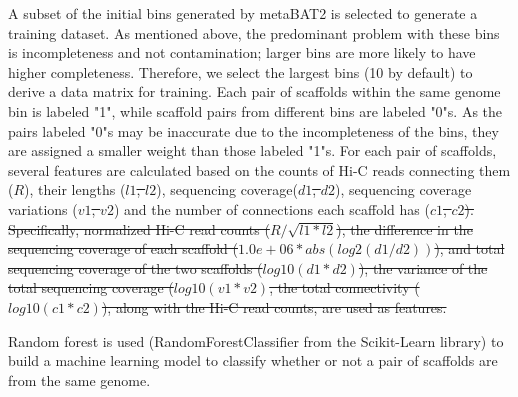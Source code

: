 \documentclass[fleqn,10pt,lineno]{wlpeerj}
\providecommand{\DIFaddtex}[1]{{\protect\color{blue}\uwave{#1}}} %
\providecommand{\DIFdeltex}[1]{{\protect\color{red}\sout{#1}}}                      %
\providecommand{\DIFaddbegin}{} %
\providecommand{\DIFaddend}{} %
\providecommand{\DIFdelbegin}{} %
\providecommand{\DIFdelend}{} %
\providecommand{\DIFadd}[1]{\texorpdfstring{\DIFaddtex{#1}}{#1}} %
\providecommand{\DIFdel}[1]{\texorpdfstring{\DIFdeltex{#1}}{}} %
\newcommand{\DIFscaledelfig}{0.5}
\newlength{\DIFdelgraphicswidth} %
\newlength{\DIFdelgraphicsheight} %
\newcommand{\DIFaddincludegraphics}[2][]{{\color{blue}\fbox{\DIFOincludegraphics[#1]{#2}}}} %
\newcommand{\DIFdelincludegraphics}[2][]{%
\sbox{\DIFdelgraphicsbox}{\DIFOincludegraphics[#1]{#2}}%
\settoboxwidth{\DIFdelgraphicswidth}{\DIFdelgraphicsbox} %
\settoboxtotalheight{\DIFdelgraphicsheight}{\DIFdelgraphicsbox} %
\scalebox{\DIFscaledelfig}{%
\parbox[b]{\DIFdelgraphicswidth}{\usebox{\DIFdelgraphicsbox}\\[-\baselineskip] \rule{\DIFdelgraphicswidth}{0em}}\llap{\resizebox{\DIFdelgraphicswidth}{\DIFdelgraphicsheight}{%
\setlength{\unitlength}{\DIFdelgraphicswidth}%
\begin{picture}(1,1)%
\thicklines\linethickness{2pt} %
{\color[rgb]{1,0,0}\put(0,0){\framebox(1,1){}}}%
{\color[rgb]{1,0,0}\put(0,0){\line( 1,1){1}}}%
{\color[rgb]{1,0,0}\put(0,1){\line(1,-1){1}}}%
\end{picture}%
}\hspace*{3pt}}} %
} %
\DeclareRobustCommand{\DIFaddbegin}{\DIFOaddbegin \let\includegraphics\DIFaddincludegraphics} %
\DeclareRobustCommand{\DIFaddend}{\DIFOaddend \let\includegraphics\DIFOincludegraphics} %
\DeclareRobustCommand{\DIFdelbegin}{\DIFOdelbegin \let\includegraphics\DIFdelincludegraphics} %
\DeclareRobustCommand{\DIFdelend}{\DIFOaddend \let\includegraphics\DIFOincludegraphics} %
\begin{document}
A subset of the initial bins generated by metaBAT2 is selected to generate a training dataset. As mentioned above, the predominant problem with these bins is incompleteness and not contamination; larger bins are more likely to have higher completeness. Therefore, we select the largest bins (10 by default) to derive a data matrix for training. Each pair of scaffolds within the same genome bin is labeled "1", while scaffold pairs from different bins are labeled "0"s. As the pairs labeled "0"s may be inaccurate due to the incompleteness of the bins, they are assigned a smaller weight than those labeled "1"s.  For each pair of scaffolds, several features are calculated based on the counts of Hi-C reads connecting them ($R$), their lengths (\DIFdelbegin \DIFdel{$l1$, $l2$}\DIFdelend \DIFaddbegin \DIFadd{$l_1$, $l_2$}\DIFaddend ), sequencing coverage(\DIFdelbegin \DIFdel{$d1$, $d2$}\DIFdelend \DIFaddbegin \DIFadd{$d_1$, $d_2$}\DIFaddend ), sequencing coverage variations (\DIFdelbegin \DIFdel{$v1$, $v2$}\DIFdelend \DIFaddbegin \DIFadd{$v_1$, $v_2$}\DIFaddend ) and the number of connections each scaffold has (\DIFdelbegin \DIFdel{$c1$, $c2$). Specifically, normalized Hi-C read counts ($R/\sqrt{l1*l2}$), the difference in the sequencing coverage of each scaffold ($1.0e+06*abs(log2(d1/d2))$), and total sequencing coverage of the two scaffolds ($log10(d1*d2)$), the variance of the total sequencing coverage ($log10(v1*v2)$, the total connectivity ($log10(c1*c2)$), along with the Hi-C read counts, are used as features. 
}\DIFdelend \DIFaddbegin \DIFadd{$c_1$, $c_2$). }
\DIFaddend 

Random forest is used (RandomForestClassifier from the Scikit-Learn library) to build a machine learning model to classify whether or not a pair of scaffolds are from the same genome. 
\end{document}
